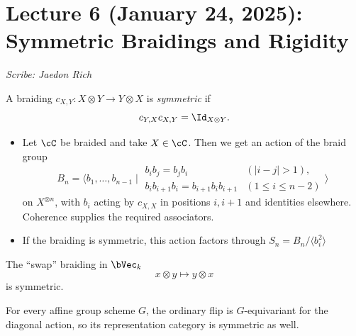 \section{Lecture 6 (January 24, 2025): Symmetric Braidings and Rigidity}\label{lec6}
\noindent\textit{Scribe: Jaedon Rich}
 

\begin{definition}
A braiding $c_{X,Y}: X \otimes Y \to Y \otimes X$ is \textit{symmetric} if $$c_{Y,X} c_{X,Y} = \Id_{X \otimes Y}.$$
\end{definition}

\begin{remark}
\hfill
    \begin{itemize}
        \item Let $\cC$ be braided and take $X \in \cC$. Then we get an action of the braid group 
        \[
        B_n=\langle b_1,\ldots,b_{n-1}\mid
        \begin{array}{ll}
        b_ib_j=b_jb_i&(|i-j|>1),\\
        b_ib_{i+1}b_i=b_{i+1}b_ib_{i+1}&(1\leq i\leq n-2)
        \end{array}\rangle
        \]
        on $X^{\otimes n}$, with $b_i$ acting by $c_{X,X}$ in positions $i,i+1$ and identities elsewhere. Coherence supplies the required associators.
        \item If the braiding is symmetric, this action factors through $S_n = B_n/\langle b_i^2 \rangle$
    \end{itemize}
\end{remark}
\begin{example}
The ``swap'' braiding in $\bVec_k$
\[x \otimes y \mapsto y \otimes x\]
is symmetric.
\end{example}
\begin{example}
For every affine group scheme $G$, the ordinary flip is $G$-equivariant for the diagonal action, so its representation category is symmetric as well.
\end{example}

